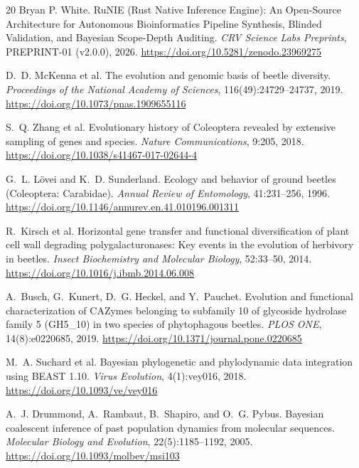 \documentclass[10pt,letterpaper]{article}
\begin{document}
\begin{thebibliography}{20}
Bryan P. White.
\newblock RuNIE (Rust Native Inference Engine): An Open-Source Architecture for Autonomous Bioinformatics Pipeline Synthesis, Blinded Validation, and Bayesian Scope-Depth Auditing.
\newblock \emph{CRV Science Labs Preprints}, PREPRINT-01 (v2.0.0), 2026. \url{https://doi.org/10.5281/zenodo.23969275}

D.~D. McKenna et al.
\newblock The evolution and genomic basis of beetle diversity.
\newblock \emph{Proceedings of the National Academy of Sciences}, 116(49):24729--24737, 2019. \url{https://doi.org/10.1073/pnas.1909655116}

S.~Q. Zhang et al.
\newblock Evolutionary history of Coleoptera revealed by extensive sampling of genes and species.
\newblock \emph{Nature Communications}, 9:205, 2018. \url{https://doi.org/10.1038/s41467-017-02644-4}

G.~L. L{\"o}vei and K.~D. Sunderland.
\newblock Ecology and behavior of ground beetles (Coleoptera: Carabidae).
\newblock \emph{Annual Review of Entomology}, 41:231--256, 1996. \url{https://doi.org/10.1146/annurev.en.41.010196.001311}

R.~Kirsch et al.
\newblock Horizontal gene transfer and functional diversification of plant cell wall degrading polygalacturonases: Key events in the evolution of herbivory in beetles.
\newblock \emph{Insect Biochemistry and Molecular Biology}, 52:33--50, 2014. \url{https://doi.org/10.1016/j.ibmb.2014.06.008}

A.~Busch, G.~Kunert, D.~G. Heckel, and Y.~Pauchet.
\newblock Evolution and functional characterization of CAZymes belonging to subfamily 10 of glycoside hydrolase family 5 (GH5\_10) in two species of phytophagous beetles.
\newblock \emph{PLOS ONE}, 14(8):e0220685, 2019. \url{https://doi.org/10.1371/journal.pone.0220685}

M.~A. Suchard et al.
\newblock Bayesian phylogenetic and phylodynamic data integration using BEAST 1.10.
\newblock \emph{Virus Evolution}, 4(1):vey016, 2018. \url{https://doi.org/10.1093/ve/vey016}

A.~J. Drummond, A.~Rambaut, B.~Shapiro, and O.~G. Pybus.
\newblock Bayesian coalescent inference of past population dynamics from molecular sequences.
\newblock \emph{Molecular Biology and Evolution}, 22(5):1185--1192, 2005. \url{https://doi.org/10.1093/molbev/msi103}


\end{thebibliography}
\end{document}
